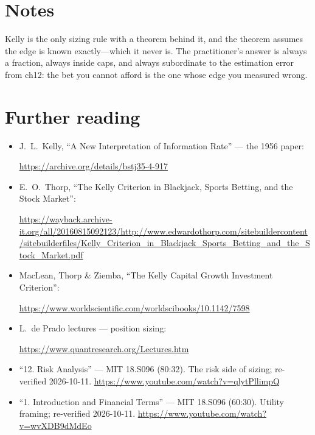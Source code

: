 \section*{Notes}
Kelly is the only sizing rule with a theorem behind it, and the theorem assumes the edge
is known exactly---which it never is. The practitioner's answer is always a fraction,
always inside caps, and always subordinate to the estimation error from ch12: the bet
you cannot afford is the one whose edge you measured wrong.

\section*{Further reading}
\begin{itemize}
\item J.~L.~Kelly, ``A New Interpretation of Information Rate'' --- the 1956 paper:

\url{https://archive.org/details/bstj35-4-917}
\item E.~O.~Thorp, ``The Kelly Criterion in Blackjack, Sports Betting, and the Stock Market'':

\url{https://wayback.archive-it.org/all/20160815092123/http://www.edwardothorp.com/sitebuildercontent/sitebuilderfiles/Kelly_Criterion_in_Blackjack_Sports_Betting_and_the_Stock_Market.pdf}
\item MacLean, Thorp \& Ziemba, ``The Kelly Capital Growth Investment Criterion'':

\url{https://www.worldscientific.com/worldscibooks/10.1142/7598}
\item L.~de Prado lectures --- position sizing:

\url{https://www.quantresearch.org/Lectures.htm}
\end{itemize}

\begin{rulebox}
\begin{itemize}
\item ``12. Risk Analysis'' --- MIT 18.S096 (80:32). The risk side of sizing; re-verified
2026-10-11.
\url{https://www.youtube.com/watch?v=qlytPllimpQ}
\item ``1. Introduction and Financial Terms'' --- MIT 18.S096 (60:30). Utility framing;
re-verified 2026-10-11.
\url{https://www.youtube.com/watch?v=wvXDB9dMdEo}
\end{itemize}
\end{rulebox}
